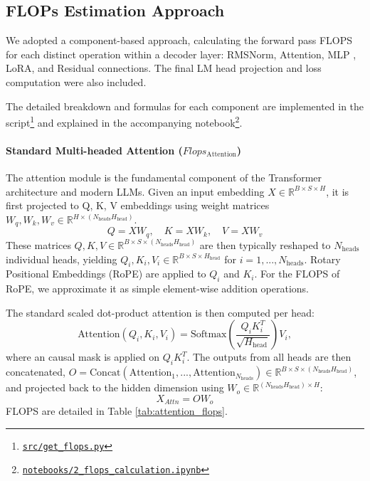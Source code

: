 \documentclass{article}
\begin{document}
\subsection{FLOPs Estimation Approach}

We adopted a component-based approach, calculating the forward pass FLOPS for each distinct operation within a decoder layer: RMSNorm, Attention, MLP , LoRA, and Residual connections. The final LM head projection and loss computation were also included.

The detailed breakdown and formulas for each component are implemented in the script\footnote{\href{https://gitlab.developers.cam.ac.uk/phy/data-intensive-science-mphil/assessments/m2_coursework/ym429/-/blob/main/src/get_flops.py?ref_type=heads}{\texttt{src/get\_flops.py}}} and explained in the accompanying notebook\footnote{\href{https://gitlab.developers.cam.ac.uk/phy/data-intensive-science-mphil/assessments/m2_coursework/ym429/-/blob/main/notebooks/2_flops_calculation.ipynb?ref_type=heads}{\texttt{notebooks/2\_flops\_calculation.ipynb}}}.




\paragraph{Standard Multi-headed Attention ($Flops_{\text{Attention}}$)}
The attention module is the fundamental component of the Transformer architecture and modern LLMs. Given an input embedding $X \in \mathbb{R}^{B \times S \times H}$, it is first projected to Q, K, V embeddings using weight matrices $W_q, W_k, W_v \in \mathbb{R}^{H \times (N_{\text{heads}}H_{\text{head}})}$. 
\begin{equation}
    Q = X W_q, \quad K = X W_k, \quad V = X W_v 
\end{equation}
These matrices $Q, K, V \in \mathbb{R}^{B \times S \times (N_{\text{heads}}H_{\text{head}})}$ are then typically reshaped to $N_{\text{heads}}$ individual heads, yielding $Q_i, K_i, V_i \in \mathbb{R}^{B \times S \times H_{\text{head}}}$ for $i=1, ..., N_{\text{heads}}$. Rotary Positional Embeddings (RoPE) \cite{su2023roformerenhancedtransformerrotary} are applied to $Q_i$ and $K_i$. For the FLOPS of RoPE, we approximate it as simple element-wise addition operations.

The standard scaled dot-product attention is then computed per head:
\begin{equation}
    \text{Attention}(Q_i, K_i, V_i) = \text{Softmax}\left(\frac{Q_i K_i^T}{\sqrt{H_{\text{head}}}}\right) V_i, 
\end{equation}
where an causal mask is applied on $Q_i K_i^T$.
The outputs from all heads are then concatenated, $O = \text{Concat}(\text{Attention}_1, ..., \text{Attention}_{N_{\text{heads}}}) \in \mathbb{R}^{B \times S \times (N_{\text{heads}}H_{\text{head}})}$, and projected back to the hidden dimension using $W_o \in \mathbb{R}^{(N_{\text{heads}}H_{\text{head}}) \times H}$:
\begin{equation}
    X_{Attn} = O W_o
\end{equation}
FLOPS are detailed in Table \ref{tab:attention_flops}.
\end{document}
